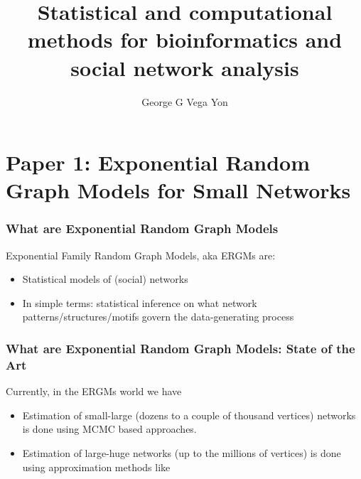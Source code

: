 \documentclass{beamer}
\title{Statistical and computational methods for bioinformatics and social network analysis\linebreak{\small or how did I learn to stop worrying and love the bomb}}
\author[GGVY]{George G Vega Yon}
\institute[USC-PREVMED]{University of Southern California, Department of Preventive Medicine}
\def\cursection{\frame{\tableofcontents[current]}}
\begin{document}


\begin{frame}
\maketitle
\end{frame}

\section{Paper 1: Exponential Random Graph Models for Small Networks}
\cursection

\begin{frame}
\frametitle{What are Exponential Random Graph Models}

Exponential Family Random Graph Models, aka ERGMs are:

\begin{itemize}
\item Statistical models of (social) networks
\item In simple terms: statistical inference on what network patterns/structures/motifs
govern the data-generating process
\end{itemize}

\end{frame}

\begin{frame}
\frametitle{What are Exponential Random Graph Models: State of the Art}

Currently, in the ERGMs world we have

\begin{itemize}
\item Estimation of small-large (dozens to a couple of thousand vertices) networks
is done using MCMC based approaches.
\item Estimation of large-huge networks (up to the millions of vertices) is done
using approximation methods like
\end{itemize}

\end{frame}
\end{document}
